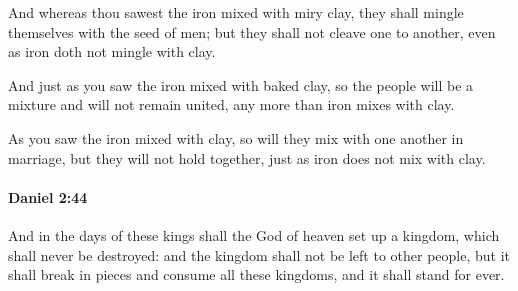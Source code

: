 			\begin{versebox}
					\item[BHS] 
					\item[LXX] 
					\item[ASV] And whereas thou sawest the iron mixed with miry clay, they shall mingle themselves with the seed of men; but they shall not cleave one to another, even as iron doth not mingle with clay.
					\item[NIV] And just as you saw the iron mixed with baked clay, so the people will be a mixture and will not remain united, any more than iron mixes with clay.
					\item[NRSV] As you saw the iron mixed with clay, so will they mix with one another in marriage, but they will not hold together, just as iron does not mix with clay.
			\end{versebox}

		\paragraph{Daniel 2:44} %
			\label{DANIEL-2-44}

			And in the days of these kings shall the God of heaven set up a kingdom, which shall never be destroyed: and the kingdom shall not be left to other people, but it shall break in pieces and consume all these kingdoms, and it shall stand for ever.

